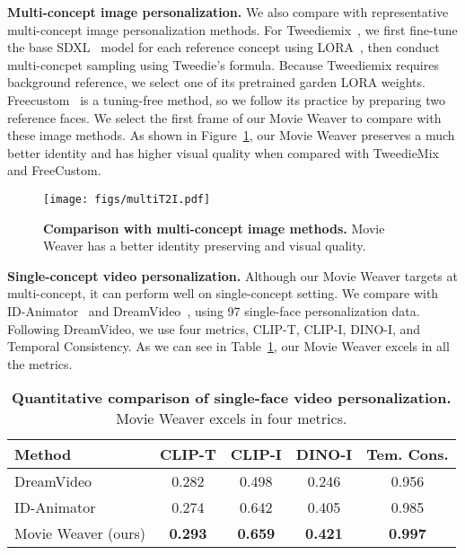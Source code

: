 \textbf{Multi-concept image personalization.} 
We also compare with representative multi-concept image personalization methods. 
For Tweediemix~\cite{kwon2024tweediemix}, we first fine-tune the base SDXL~\cite{podell2023sdxl} model for each reference concept using LORA~\cite{hu2021lora}, then conduct multi-concpet sampling using Tweedie’s formula. 
Because Tweediemix requires background reference, we select one of its pretrained garden LORA weights.
Freecustom~\cite{ding2024freecustom} is a tuning-free method, so we follow its practice by preparing two reference faces.
We select the first frame of our Movie Weaver to compare with these image methods.
As shown in Figure~\ref{fig:multi_concept_t2i}, our Movie Weaver preserves a much better identity and has higher visual quality when compared with TweedieMix and FreeCustom.


\begin{figure}[t]
    \begin{center}
    \texttt{[image: figs/multiT2I.pdf]}
    \end{center}
    \vspace{-2em}
        \caption{\textbf{Comparison with multi-concept image methods.} Movie Weaver has a better identity preserving and visual quality.}
        \vspace{-1em}
    \label{fig:multi_concept_t2i}
\end{figure}


\textbf{Single-concept video personalization.} Although our Movie Weaver targets at multi-concept, it can perform well on single-concept setting. We compare with ID-Animator~\cite{he2024id} and DreamVideo~\cite{wei2024dreamvideo}, using 97 single-face personalization data. Following DreamVideo, we use four metrics, CLIP-T, CLIP-I, DINO-I, and Temporal Consistency. 
As we can see in Table~\ref{tab:quant_comp_singleface}, our Movie Weaver excels in all the metrics.  




\begin{table}[t]
\vspace{-0.8em}
\centering
\small
\setlength{\tabcolsep}{3pt} %
\begin{tabular}{lcccc}
\toprule
\textbf{Method} & \textbf{CLIP-T} & \textbf{CLIP-I} & \textbf{DINO-I} & \textbf{Tem. Cons.} \\
\midrule
DreamVideo  & 0.282     &  0.498      &  0.246      &  0.956  \\
ID-Animator & 0.274     &  0.642      &  0.405      &  0.985  \\
Movie Weaver (ours) & \textbf{0.293}  &  \textbf{0.659}      &  \textbf{0.421}      &  \textbf{0.997}  \\
\bottomrule
\end{tabular}
\vspace{-1em}
\caption{\textbf{Quantitative comparison of single-face video personalization.} Movie Weaver excels in four metrics.}
\label{tab:quant_comp_singleface}
\end{table}


